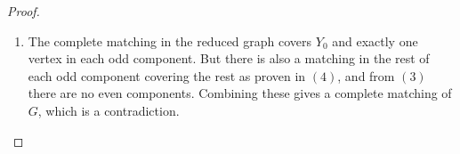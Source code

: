 \documentclass[12pt]{article}
\begin{document}
\begin{proof}
\begin{enumerate}
\item The complete matching in the reduced graph covers $Y_0$ and exactly one vertex in each odd component. But there is also a matching in the rest of each odd component covering the rest as proven in $(4)$, and from $(3)$ there are no even components. Combining these gives a complete matching of $G$, which is a contradiction.
\end{enumerate}
\end{proof}
\end{document}
